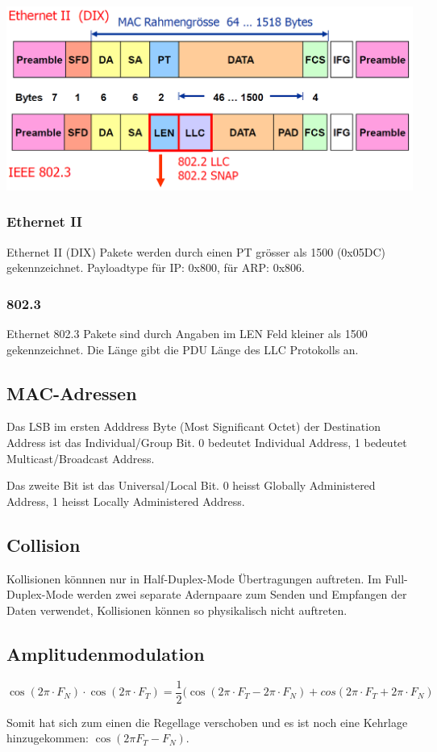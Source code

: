 \includegraphics[scale=0.5]{media/MACFrame.png}

\subsubsection{Ethernet II}

Ethernet II (DIX) Pakete werden durch einen PT grösser als 1500
(0x05DC) gekennzeichnet. Payloadtype für IP: 0x800, für ARP: 0x806.

\subsubsection{802.3}

Ethernet 802.3 Pakete sind durch Angaben im LEN Feld kleiner als 1500
gekennzeichnet. Die Länge gibt die PDU Länge des LLC Protokolls an.


\subsection{MAC-Adressen}

Das LSB im ersten Adddress Byte (Most Significant Octet) der Destination Address
ist das Individual/Group Bit. 0 bedeutet Individual Address, 1 bedeutet
Multicast/Broadcast Address.

Das zweite Bit ist das Universal/Local Bit. 0 heisst Globally Administered
Address, 1 heisst Locally Administered Address.


\subsection{Collision}

Kollisionen könnnen nur in Half-Duplex-Mode Übertragungen auftreten. Im
Full-Duplex-Mode werden zwei separate Adernpaare zum Senden und Empfangen der
Daten verwendet, Kollisionen können so physikalisch nicht auftreten.


\subsection{Amplitudenmodulation}

\[
	\cos (2\pi \cdot F_N) \cdot \cos (2\pi \cdot F_T)
	= \frac{1}{2}(\cos (2\pi \cdot F_T - 2\pi \cdot F_N)
	+ cos(2\pi \cdot F_T + 2\pi \cdot F_N)
\]

Somit hat sich zum einen die Regellage verschoben und es ist noch eine Kehrlage
hinzugekommen: $\cos (2\pi F_T - F_N)$.
